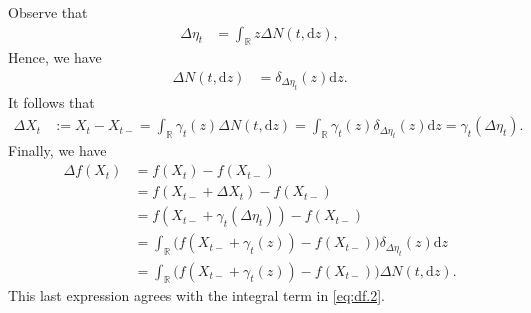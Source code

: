 \documentclass[12pt]{book}
\numberwithin{equation}{chapter}
\theoremstyle{plain}
\numberwithin{theorem}{section}
\theoremstyle{definition}
\numberwithin{exercise}{chapter}
\newcommand{\<}{\langle}
\renewcommand{\>}{\rangle}
\renewcommand{\(}{\left(}
\renewcommand{\)}{\right)}
\renewcommand{\[}{\left[}
\renewcommand{\]}{\right]}
\newcommand\Rb{\mathds{R}}
\newcommand\gam{\gamma}
\newcommand\del{\delta}
\newcommand\Del{\Delta}
\newcommand\dd{\mathrm{d}}
\begin{document}
Observe that
\begin{align}
\Del \eta_t
	&=	\int_\Rb z \Del N(t, \dd z) ,  \label{eq:eta-jump}
\end{align}
Hence, we have
\begin{align}
\Del N( t, \dd z )
	&=	\del_{\Del \eta_t}(z) \dd z .
\end{align}
It follows that
\begin{align}
\Del X_t
	&:=	X_t - X_{t-}
	=	\int_\Rb \gam_t(z) \Del N( t, \dd z) 
	=		\int_\Rb \gam_t(z) \del_{\Del \eta_t}(z) \dd z
	=		\gam_t(\Del \eta_t) .
\end{align}
Finally, we have
\begin{align}
\Del f(X_t)
	&=	f(X_t) - f(X_{t-}) \\
	&=	f(X_{t-} + \Del X_t) - f(X_{t-}) \\
	&= 	f(X_{t-} + \gam_t({\Del \eta_t}) ) - f(X_{t-}) \\
	&=	\int_\Rb \Big( f(X_{t-} + \gam_t(z) ) - f(X_{t-}) \Big) \del_{\Del \eta_t}(z) \dd z \\
	&=	\int_\Rb \Big( f(X_{t-} + \gam_t(z) ) - f(X_{t-}) \Big) \Del N(t, \dd z) .
\end{align}
This last expression agrees with the integral term in \eqref{eq:df.2}.  
\end{document}
